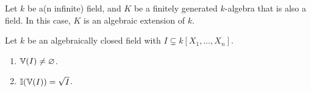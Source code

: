 \documentclass{ximera}
\begin{document}
\begin{theorem}
  Let $k$ be a(n infinite) field, and $K$ be a finitely generated
  $k$-algebra that is also a field. In this case, $K$ is an algebraic
  extension of $k$.
  \end{theorem}




\begin{theorem}[Nullstellensatz]
  Let $k$ be an algebraically closed field with $I \subsetneq k[X_1,\dots,X_n]$.
  \begin{enumerate}
  \item $\mathbb V(I) \ne \varnothing$.
  \item $\mathbb I(\mathbb V(I)) = \sqrt{I}$.
  \end{enumerate}
\end{theorem}
\end{document}
